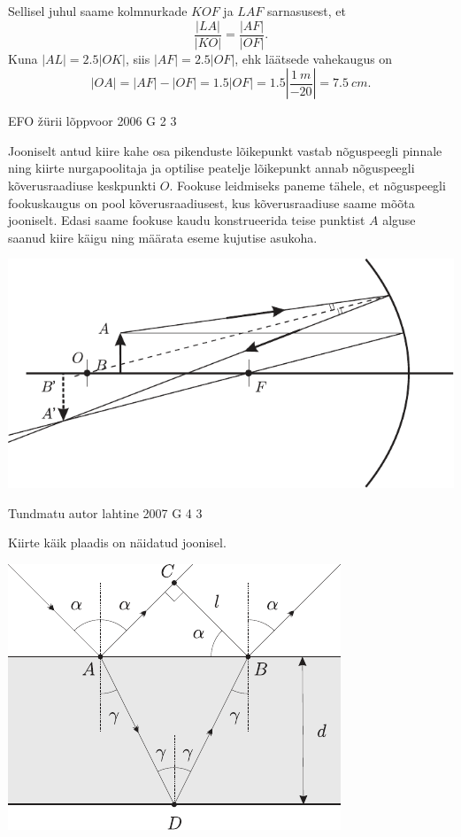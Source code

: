 \documentclass[11pt]{article}
\begin{document}
{{Sellisel juhul saame kolmnurkade $KOF$ ja $LAF$ sarnasusest, et 
\[
\frac{|LA|}{|KO|}=\frac{|AF|}{|OF|}.
\]
Kuna $|AL| = \num{2.5}|OK|$, siis $|AF| = \num{2.5}|OF|$, ehk läätsede vahekaugus on 
\[
|OA| = |AF| - |OF| = \num{1.5}|OF| = \num{1.5} \left\lvert\frac{\SI{1}{m}}{\num{-20}}\right\rvert = \SI{7.5}{cm}.
\]
\fi
}

{EFO žürii} %
{lõppvoor} %
{2006} %
{G 2} %
{3} %
{

\ifSolution
Jooniselt antud kiire kahe osa pikenduste lõikepunkt vastab nõguspeegli pinnale ning kiirte nurgapoolitaja ja optilise peatelje lõikepunkt annab nõguspeegli kõverusraadiuse keskpunkti $O$. Fookuse leidmiseks paneme tähele, et nõguspeegli fookuskaugus on pool kõverusraadiusest, kus kõverusraadiuse saame mõõta jooniselt. Edasi saame fookuse kaudu konstrueerida teise punktist $A$ alguse saanud kiire käigu ning määrata eseme kujutise asukoha.

\begin{center}
	\includegraphics[width=\linewidth]{2006-v3g-02-lah}
\end{center}
\fi
}

{Tundmatu autor} %
{lahtine} %
{2007} %
{G 4} %
{3} %
{

\ifSolution
Kiirte käik plaadis on näidatud joonisel.

\begin{center}
	\includegraphics[width=0.7\linewidth]{2007-lahg-04-lah}
\end{center}

}}
\end{document}

